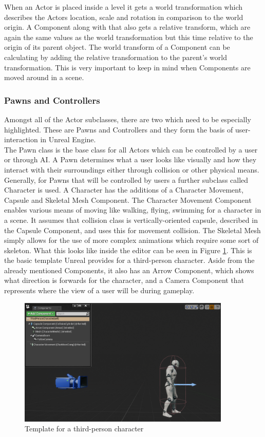 When an Actor is placed inside a level it gets a world transformation which describes the Actors location, scale and rotation in comparison to the world origin. A Component along with that also gets a relative transform, which are again the same values as the world transformation but this time relative to the origin of its parent object. The world transform of a Component can be calculating by adding the relative transformation to the parent's world transformation. This is very important to keep in mind when Components are moved around in a scene. 

\subsubsection{Pawns and Controllers}
Amongst all of the Actor subclasses, there are two which need to be especially highlighted. These are Pawns and Controllers and they form the basis of user-interaction in Unreal Engine.\\
The Pawn class is the base class for all Actors which can be controlled by a user or through \acs{AI}\cite{bib:UEPawn}. A Pawn determines what a user looks like visually and how they interact with their surroundings either through collision or other physical means. Generally, for Pawns that will be controlled by users a further subclass called Character is used\cite{bib:UECharacter}. A Character has the additions of a Character Movement, Capsule and Skeletal Mesh Component. The Character Movement Component enables various means of moving like walking, flying, swimming for a character in a scene. It assumes that collision class is vertically-oriented capsule, described in the Capsule Component, and uses this for movement collision. The Skeletal Mesh simply allows for the use of more complex animations which require some sort of skeleton. What this looks like inside the editor can be seen in Figure \ref{fig:UnrealCharacter}. This is the basic template Unreal provides for a third-person character. Aside from the already mentioned Components, it also has an Arrow Component, which shows what direction is forwards for the character, and a Camera Component that represents where the view of a user will be during gameplay.\\

\begin{figure}[htpb]
	\centering
	\includegraphics[width=0.9\textwidth]{fig/UnrealCharacter.png}
	\caption[Template for third person character]{Template for a third-person character\protect}
	\label{fig:UnrealCharacter}
\end{figure}

